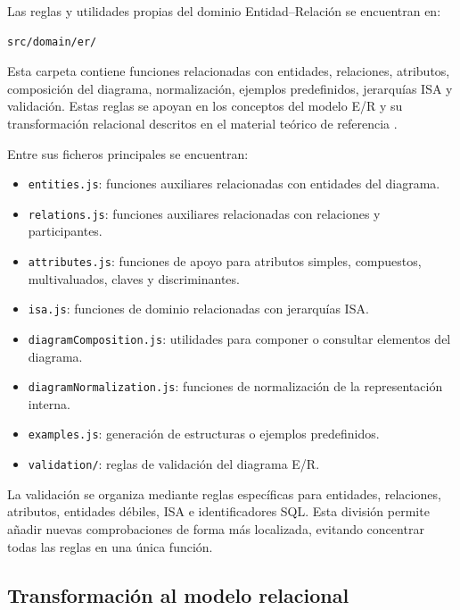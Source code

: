 Las reglas y utilidades propias del dominio Entidad--Relación se encuentran en:

\begin{verbatim}
src/domain/er/
\end{verbatim}

Esta carpeta contiene funciones relacionadas con entidades, relaciones, atributos, composición del diagrama, normalización, ejemplos predefinidos, jerarquías ISA y validación. Estas reglas se apoyan en los conceptos del modelo E/R y su transformación relacional descritos en el material teórico de referencia \cite{tema6}.

Entre sus ficheros principales se encuentran:

\begin{itemize}
\item \texttt{entities.js}: funciones auxiliares relacionadas con entidades del diagrama.

\item \texttt{relations.js}: funciones auxiliares relacionadas con relaciones y participantes.

\item \texttt{attributes.js}: funciones de apoyo para atributos simples, compuestos, multivaluados, claves y discriminantes.

\item \texttt{isa.js}: funciones de dominio relacionadas con jerarquías ISA.

\item \texttt{diagramComposition.js}: utilidades para componer o consultar elementos del diagrama.

\item \texttt{diagramNormalization.js}: funciones de normalización de la representación interna.

\item \texttt{examples.js}: generación de estructuras o ejemplos predefinidos.

\item \texttt{validation/}: reglas de validación del diagrama E/R.

\end{itemize}

La validación se organiza mediante reglas específicas para entidades, relaciones, atributos, entidades débiles, ISA e identificadores SQL. Esta división permite añadir nuevas comprobaciones de forma más localizada, evitando concentrar todas las reglas en una única función.

\subsection{Transformación al modelo relacional}

